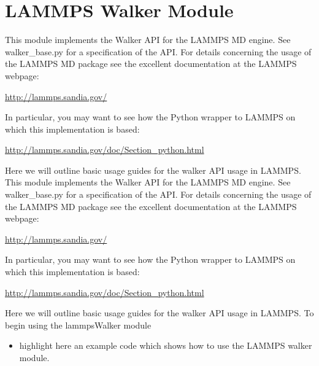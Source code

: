 \documentclass[letterpaper,10pt,english]{sphinxmanual}
\begin{document}
\section{LAMMPS Walker Module}
\label{walker_api/walker_api.doc:lammps-walker-module}
This module implements the Walker API for the LAMMPS MD engine. See walker\_base.py for a specification of the API. For details concerning the usage of the LAMMPS MD package see the excellent documentation at the LAMMPS webpage:

\url{http://lammps.sandia.gov/}

In particular, you may want to see how the Python wrapper to LAMMPS on which this implementation is based:

\url{http://lammps.sandia.gov/doc/Section\_python.html}

Here we will outline basic usage guides for the walker API usage in LAMMPS.
\label{walker_api/walker_api.doc:module-lammpsWalker}
This module implements the Walker API for the LAMMPS MD engine. See walker\_base.py for a specification of the API. For details concerning the usage of the LAMMPS MD package see the excellent documentation at the LAMMPS webpage:

\url{http://lammps.sandia.gov/}

In particular, you may want to see how the Python wrapper to LAMMPS on which this implementation is based:

\url{http://lammps.sandia.gov/doc/Section\_python.html}

Here we will outline basic usage guides for the walker API usage in LAMMPS. To begin using the lammpsWalker module
\begin{itemize}
\item {} 
highlight here an example code which shows how to use the LAMMPS walker module.

\end{itemize}
\end{document}
